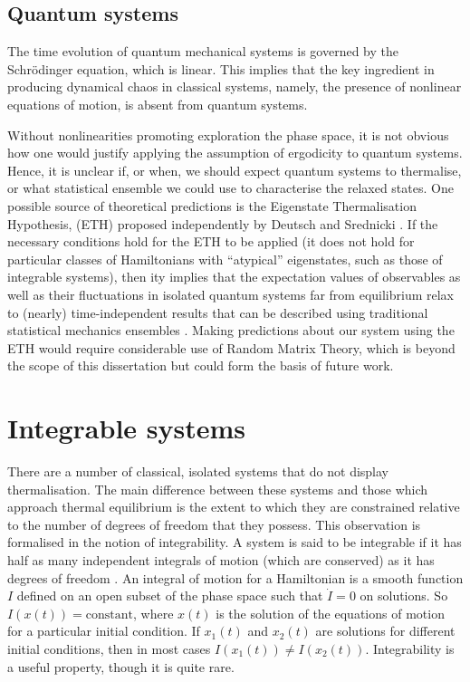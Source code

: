 \documentclass[a4paper, 10pt]{article}
\theoremstyle{plain}
\begin{document}
\subsection{Quantum systems}

The time evolution of quantum mechanical systems is governed by the
Schr\"odinger equation, which is linear. This implies that the key ingredient
in producing dynamical chaos in classical systems, namely, the presence of
nonlinear equations of motion, is absent from quantum systems.

Without nonlinearities promoting exploration the phase space, it is
not obvious how one would justify applying the assumption of ergodicity to
quantum systems. Hence, it is unclear if, or when, we should expect quantum systems to
thermalise, or what statistical ensemble we could use to characterise the
relaxed states. One possible source of theoretical predictions is the
Eigenstate Thermalisation Hypothesis, (ETH) proposed independently by Deutsch
\cite{Deutsch1991} and Srednicki \cite{Srednicki1994}. If the necessary
conditions hold for the ETH to be applied (it does not hold for particular 
classes of Hamiltonians with ``atypical'' eigenstates, such as those of 
integrable systems), then ity implies that the expectation values
of observables as well as their fluctuations in isolated quantum systems
far from equilibrium relax to (nearly) time-independent results that can be
described using traditional statistical mechanics ensembles \cite{DAlessio2016}. 
Making predictions about our system using the ETH would require considerable 
use of Random Matrix Theory, which is beyond the scope of this dissertation but 
could form the basis of future work.
\newpage
\section{Integrable systems}

There are a number of classical, isolated systems that do not display
thermalisation. The main difference between these systems and those which
approach thermal equilibrium is the extent to which they are constrained
relative to the number of degrees of freedom that they possess. This observation
is formalised in the notion of integrability. A system is said to be integrable
if it has half as many independent integrals of motion (which are conserved)
as it has degrees of freedom \cite{deLeeuw2013}. An integral of motion for a Hamiltonian is a
smooth function $I$ defined on an open subset of the phase space such that
$\dot{I}=0$ on solutions. So $I(x(t))=\text{constant}$, where $x(t)$ is the
solution of the equations of motion for a particular initial condition. If
$x_1(t)$ and $x_2(t)$ are solutions for different initial conditions, then in
most cases $I(x_1(t))\ne I(x_2(t))$. Integrability is a useful property, though
it is quite rare.
\end{document}
